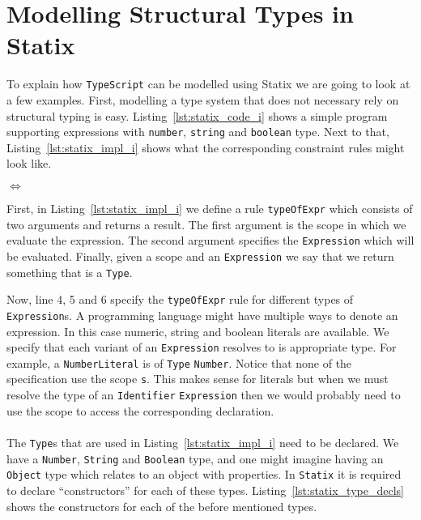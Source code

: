 \documentclass{article}
\newcommand{\ttt}[1]{\texttt{#1}}
\begin{document}
\section*{Modelling Structural Types in Statix}
To explain how \ttt{TypeScript} can be modelled using Statix we are going to look at a few examples.
First, modelling a type system that does not necessary rely on structural typing is easy.
Listing~\ref{lst:statix_code_i} shows a simple program supporting expressions with \ttt{number}, \ttt{string} and \ttt{boolean} type.
Next to that, Listing~\ref{lst:statix_impl_i} shows what the corresponding constraint rules might look like.

\noindent
\begin{minipage}{.32\textwidth}

\end{minipage}
\hfill$\Longleftrightarrow$\hfill\hfill\hfill
\begin{minipage}{.58\textwidth}

\end{minipage}
First, in Listing~\ref{lst:statix_impl_i} we define a rule \ttt{typeOfExpr} which consists of two arguments and returns a result.
The first argument is the scope in which we evaluate the expression.
The second argument specifies the \ttt{Expression} which will be evaluated.
Finally, given a scope and an \ttt{Expression} we say that we return something that is a \ttt{Type}.

Now, line 4, 5 and 6 specify the \ttt{typeOfExpr} rule for different types of \ttt{Expression}s.
A programming language might have multiple ways to denote an expression.
In this case numeric, string and boolean literals are available.
We specify that each variant of an \ttt{Expression} resolves to is appropriate type.
For example, a \ttt{NumberLiteral} is of \ttt{Type} \ttt{Number}.
Notice that none of the specification use the scope \ttt{s}.
This makes sense for literals but when we must resolve the type of an \ttt{Identifier} \ttt{Expression} then we would probably need to use the scope to access the corresponding declaration.
\\\\
The \ttt{Type}s that are used in Listing~\ref{lst:statix_impl_i} need to be declared.
We have a \ttt{Number}, \ttt{String} and \ttt{Boolean} type, and one might imagine having an \ttt{Object} type which relates to an object with properties.
In \ttt{Statix} it is required to declare ``constructors'' for each of these types.
Listing~\ref{lst:statix_type_decls} shows the constructors for each of the before mentioned types.
\end{document}
